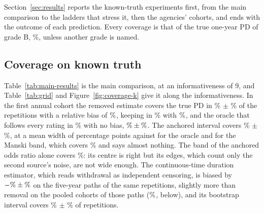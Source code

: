 Section~\ref{sec:results} reports the known-truth experiments first, from the main comparison to the ladders that stress it, then the agencies' cohorts, and ends with the outcome of each prediction. Every coverage is that of the true one-year PD of grade B, \%, unless another grade is named.

\subsection{Coverage on known truth}

Table~\ref{tab:main-results} is the main comparison, at an informativeness of 9, and Table~\ref{tab:grid} and Figure~\ref{fig:coverage-k} give it along the informativeness. In the first annual cohort the removed estimate covers the true PD in \% $\pm$ \% of the repetitions with a relative bias of $\nv{bias.fy.i9.industry}\%$, keeping in \% with $\nv{bias.fy.i9.unfollowed}\%$, and the oracle that follows every \wdn{} rating in \% with no bias, $\nv{bias.fy.i9.followed}\% \pm \nv{bse.fy.i9.followed}\%$. The anchored interval covers \% $\pm$ \%, at a mean width of  percentage points against  for the oracle and  for the Manski band, which covers \% and says almost nothing. The band of the anchored odds ratio alone covers \%: its centre is right but its edges, which count only the second source's noise, are not wide enough. The continuous-time duration estimator, which reads withdrawal as independent censoring, is biased by $-\nv{dur.i9.abias}\% \pm \nv{dur.i9.bse}\%$ on the five-year paths of the same repetitions, slightly more than removal on the pooled cohorts of those paths ($\nv{bias.pool.i9.industry}\%$, below), and its bootstrap interval covers \% $\pm$ \% of  repetitions.



